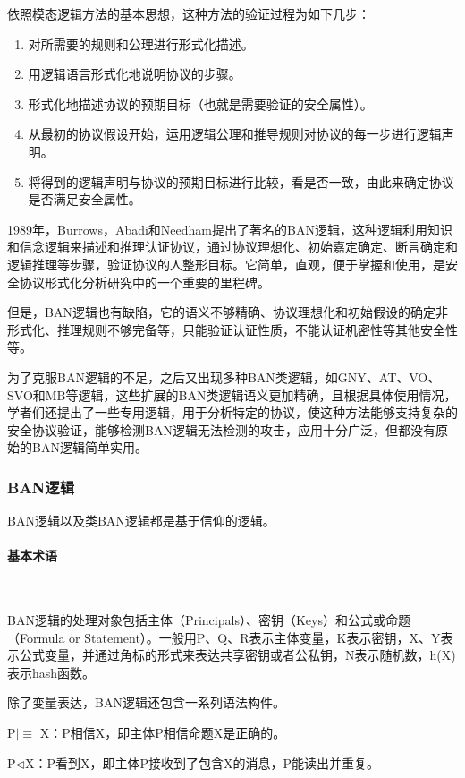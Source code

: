 \documentclass[cs4size,a4pape,UTF8]{ctexart}
\numberwithin{equation}{section}
\numberwithin{table}{section}
\numberwithin{figure}{section}
\begin{document}
依照模态逻辑方法的基本思想，这种方法的验证过程为如下几步：

\begin{enumerate}[(1)]
\item 对所需要的规则和公理进行形式化描述。
\item 用逻辑语言形式化地说明协议的步骤。
\item 形式化地描述协议的预期目标（也就是需要验证的安全属性）。
\item 从最初的协议假设开始，运用逻辑公理和推导规则对协议的每一步进行逻辑声明。
\item 将得到的逻辑声明与协议的预期目标进行比较，看是否一致，由此来确定协议是否满足安全属性。
\end{enumerate}

1989年，Burrows，Abadi和Needham提出了著名的BAN逻辑，这种逻辑利用知识和信念逻辑来描述和推理认证协议，通过协议理想化、初始嘉定确定、断言确定和逻辑推理等步骤，验证协议的人整形目标。它简单，直观，便于掌握和使用，是安全协议形式化分析研究中的一个重要的里程碑\cite{2}。

但是，BAN逻辑也有缺陷，它的语义不够精确、协议理想化和初始假设的确定非形式化、推理规则不够完备等，只能验证认证性质，不能认证机密性等其他安全性等\cite{2}。

为了克服BAN逻辑的不足，之后又出现多种BAN类逻辑，如GNY、AT、VO、SVO和MB等逻辑，这些扩展的BAN类逻辑语义更加精确，且根据具体使用情况，学者们还提出了一些专用逻辑，用于分析特定的协议，使这种方法能够支持复杂的安全协议验证，能够检测BAN逻辑无法检测的攻击，应用十分广泛，但都没有原始的BAN逻辑简单实用。


\subsubsection{BAN逻辑}
BAN逻辑以及类BAN逻辑都是基于信仰的逻辑。
\paragraph{基本术语}\

BAN逻辑的处理对象包括主体（Principals）、密钥（Keys）和公式或命题（Formula or Statement）。一般用P、Q、R表示主体变量，K表示密钥，X、Y表示公式变量，并通过角标的形式来表达共享密钥或者公私钥，N表示随机数，h(X)表示hash函数。

除了变量表达，BAN逻辑还包含一系列语法构件。

P$\lvert\equiv$ X：P相信X，即主体P相信命题X是正确的。

P$\triangleleft$X：P看到X，即主体P接收到了包含X的消息，P能读出并重复。
\end{document}

